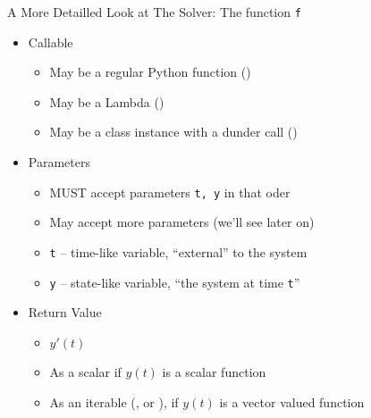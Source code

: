 \begin{frame}[fragile]{A More Detailled Look at The Solver: The function \texttt{f}}
%
\begin{itemize}
\item Callable
	\begin{itemize}
	\item May be a regular Python function ()
	\item May be a Lambda ()
	\item May be a class instance with a dunder call ()
	\end{itemize}
\item Parameters
	\begin{itemize}
	\item MUST accept parameters \texttt{t, y} in that oder
	\item May accept more parameters (we'll see later on)
	\item \texttt{t} -- time-like variable, \enquote{external} to the system
	\item \texttt{y} -- state-like variable, \enquote{the system at time \texttt{t}}
	\end{itemize}
\item Return Value
	\begin{itemize}
	\item $y'(t)$
	\item As a scalar if $y(t)$ is a scalar function
	\item As an iterable (\zB {},  or ), if $y(t)$ is a vector valued function
	\end{itemize}
\end{itemize}
%
\end{frame}

